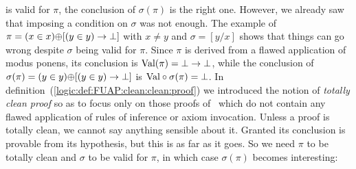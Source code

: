 is valid for $\pi$, the conclusion of $\sigma(\pi)$ is the right
one. However, we already saw that imposing a condition on $\sigma$
was not enough. The example of $\pi=(x\in x)\mbox{$\oplus$}[(y\in y)\to\bot]$
with $x\neq y$ and $\sigma=[y/x]$ shows that things can go wrong
despite $\sigma$ being valid for $\pi$. Since $\pi$ is derived from
a flawed application of modus ponens, its conclusion is
$\mbox{\rm Val}(\pi)=\bot\to\bot$, while the conclusion of $\sigma(\pi)=(y\in
y)\mbox{$\oplus$}[(y\in y)\to\bot]$ is $\mbox{\rm Val}\circ\sigma(\pi)=\bot$. In
definition~(\ref{logic:def:FUAP:clean:clean:proof}) we introduced
the notion of {\em totally clean proof} so as to focus only on those
proofs of \pvs\ which do not contain any flawed application of rules
of inference or axiom invocation. Unless a proof is totally clean,
we cannot say anything sensible about it. Granted its conclusion is
provable from its hypothesis, but this is as far as it goes. So we
need $\pi$ to be totally clean and $\sigma$ to be valid for $\pi$,
in which case $\sigma(\pi)$ becomes interesting:

